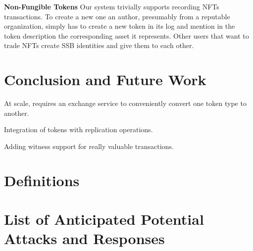 \documentclass[sigplan,screen,10pt]{acmart}
\begin{document}
\textbf{Non-Fungible Tokens} Our system trivially supports recording NFTs transactions. To create a new one an author, presumably from a reputable organization, simply has to create a new token in its log and mention in the token description the corresponding asset it represents. Other users that want to trade NFTs create SSB identities and give them to each other.

\section{Conclusion and Future Work}
\label{section:conclusion}

At scale, requires an exchange service to conveniently convert one token type to another.

Integration of tokens with replication operations.

Adding witness support for really valuable transactions.









\appendix

\section{Definitions}








\section{List of Anticipated Potential Attacks and Responses}
\end{document}
